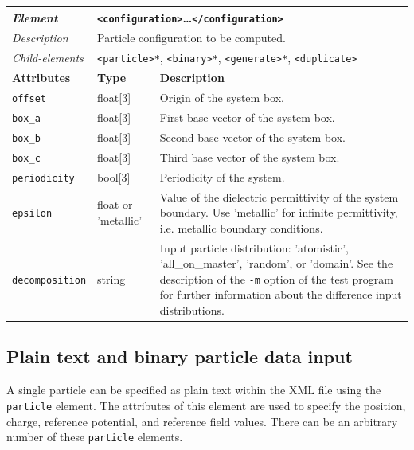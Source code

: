 \begin{center}
\small
\begin{tabular}{|p{3cm}|p{1.5cm}|p{8.5cm}|}
  \hline
  \textit{Element}        & \multicolumn{2}{p{10cm}|}{\texttt{<configuration>}\dots\texttt{</configuration>}} \\ \hline
  \textit{Description}    & \multicolumn{2}{p{10cm}|}{Particle configuration to be computed.} \\ \hline
  \textit{Child-elements} & \multicolumn{2}{p{10cm}|}{\texttt{<particle>*}, \texttt{<binary>*}, \texttt{<generate>*}, \texttt{<duplicate>}} \\ \hline
  \hline
  \textbf{Attributes}     & \textbf{Type} & \textbf{Description} \\ \hline
  \texttt{offset}         & float[3] & Origin of the system box. \\ \hline
  \texttt{box\_a}         & float[3] & First base vector of the system box. \\ \hline
  \texttt{box\_b}         & float[3] & Second base vector of the system box. \\ \hline
  \texttt{box\_c}         & float[3] & Third base vector of the system box. \\ \hline
  \texttt{periodicity}    & bool[3]  & Periodicity of the system. \\ \hline
  \texttt{epsilon}        & float or \newline 'metallic' & Value of the dielectric permittivity of the system boundary. Use 'metallic' for infinite permittivity, i.e. metallic boundary conditions. \\ \hline
  \texttt{decomposition}  & string & Input particle distribution: 'atomistic', 'all\_on\_master', 'random', or 'domain'. See the description of the \texttt{-m} option of the test program for further information about the difference input distributions. \\ \hline
\end{tabular}
\end{center}

\subsection*{Plain text and binary particle data input}

\noindent
A single particle can be specified as plain text within the XML file using the \texttt{particle} element.
The attributes of this element are used to specify the position, charge, reference potential, and reference field values.
There can be an arbitrary number of these \texttt{particle} elements.

